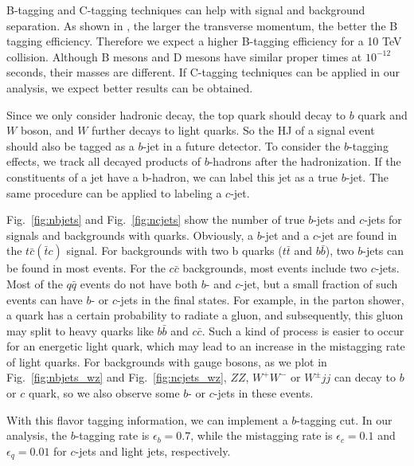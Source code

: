 \documentclass[a4paper,11pt]{article}
\begin{document}
B-tagging and C-tagging techniques can help with signal and background separation. 
As shown in \cite{ATLAS:2019bwq}, the larger the transverse momentum, the better the B tagging efficiency. 
Therefore we expect a higher B-tagging efficiency for a 10 TeV collision. 
Although B mesons and D mesons have similar proper times at $10^{-12}$ seconds, their masses are different. 
If C-tagging techniques \cite{ATLAS:2021cxe} can be applied in our analysis, we expect better results can be obtained. 

Since we only consider hadronic decay, the top quark should decay to $b$ quark and $W$ boson, 
and $W$ further decays to light quarks. 
So the HJ of a signal event should also be tagged as a $b$-jet in a future detector. 
To consider the $b$-tagging effects, we track all decayed products of $b$-hadrons after the hadronization. 
If the constituents of a jet have a b-hadron, we can label this jet as a true $b$-jet. 
The same procedure can be applied to labeling a $c$-jet. 

Fig.~\ref{fig:nbjets} and Fig.~\ref{fig:ncjets} show the number of true $b$-jets and $c$-jets for signals and backgrounds with quarks.
Obviously, a $b$-jet and a $c$-jet are found in the $t\bar{c}(\bar{t}c)$ signal. 
For backgrounds with two b quarks ($t\bar{t}$ and $b\bar{b}$), two $b$-jets can be found in most events.
For the $c\bar{c}$ backgrounds, most events include two $c$-jets.
Most of the $q\bar{q}$ events do not have both $b$- and $c$-jet, 
but a small fraction of such events can have $b$- or $c$-jets in the final states.  
For example, in the parton shower, a quark has a certain probability to radiate a gluon, 
and subsequently, this gluon may split to heavy quarks like $b\bar{b}$ and $c\bar{c}$. 
Such a kind of process is easier to occur for an energetic light quark,  
which may lead to an increase in the mistagging rate of light quarks. 
For backgrounds with gauge bosons, as we plot in Fig.~\ref{fig:nbjets_wz} and Fig.~\ref{fig:ncjets_wz}, 
$ZZ$, $W^+W^-$ or $W^{\pm}jj$ can decay to $b$ or $c$ quark, 
so we also observe some $b$- or $c$-jets in these events.

With this flavor tagging information, we can implement a $b$-tagging cut. 
In our analysis, the $b$-tagging rate is $\epsilon_{b}=0.7$, 
while the mistagging rate is $\epsilon_{c}=0.1$ and $\epsilon_{q}=0.01$ for $c$-jets and light jets, respectively.
\end{document}
